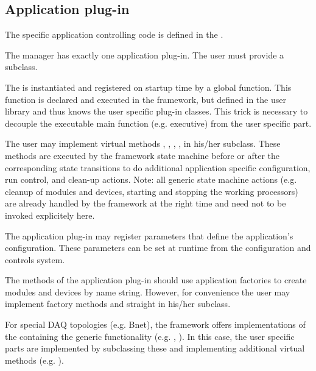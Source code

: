 \subsection{Application plug-in}
The specific application controlling code is defined in 
   the .   
\begin{compactitem}[$\circ$]
\item  The manager has exactly one application plug-in. 
      The user must provide a  subclass.
\item  The  is instantiated and registered on 
      startup time by a global  function. This function 
      is declared and executed in the framework, but defined in the user 
      library and thus knows the user specific plug-in classes. 
      This trick is necessary to decouple the executable main function 
      (e.g. \xdaq executive) from the user specific part.  
\item  The user may implement virtual methods  ,  
      , , 
      ,  in his/her 
       subclass. These methods are executed by the 
      framework state machine before or after the corresponding state 
      transitions to do additional application specific configuration, 
      run control, and clean-up actions. Note: all generic state machine 
      actions (e.g. cleanup of modules and devices, starting 
      and stopping the working processors) are already handled by 
      the framework at the right time and need not to be invoked explicitely here.
\item  The application plug-in may register parameters that 
      define the application's configuration. These parameters can be set at 
      runtime from the configuration and controls system.
\item  The methods of the application plug-in should use 
      application factories to create modules and 
      devices by name string. However, for convenience the user may 
      implement factory methods  and  straight in his/her 
       subclass.
\item   For special DAQ topologies (e.g. Bnet), the framework offers 
      implementations of the  containing the 
      generic functionality (e.g. , ). 
      In this case, the user specific parts are implemented by subclassing 
      these and implementing additional virtual methods (e.g. ).    
\end{compactitem}
               
